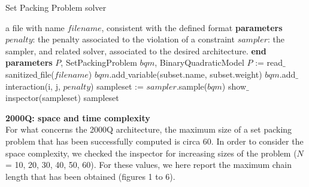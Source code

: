 \documentclass[oneside,a4paper]{article}
\begin{document}
\begin{algorithm}
\caption{Set Packing Problem solver}
\begin{algorithmic}[1]
\Require a file with name $filename$, consistent with the defined format
\State \textbf{parameters}
\Indent
    \State $penalty$: the penalty associated to the violation of a constraint
    \State $sampler$: the sampler, and related solver, associated to the desired architecture.
\EndIndent
\State \textbf{end parameters}
\Variables
 \State $P$, SetPackingProblem
 \State $bqm$, BinaryQuadraticModel
\EndVariables
\State $P$ := read$\_$sanitized$\_$file($filename$)  
        \State $bqm$.add$\_$variable(subset.name, subset.weight)   
\EndFor  \label{loop2}
            \State $bqm$.add$\_$interaction(i, j, $penalty$)   
        \EndFor
    \EndFor
\EndFor  \label{loop3}
\State sampleset := $sampler$.sample($bqm$) 
\State show$\_$inspector(sampleset) 
\State \Return sampleset 
\EndProcedure
\end{algorithmic}
\end{algorithm}

\textbf{2000Q: space and time complexity} \\

For what concerns the 2000Q architecture, the maximum size of a set packing problem that has been successfully computed is circa 60. In order to consider the space complexity, we checked the inspector for increasing sizes of the problem ($N$ = 10, 20, 30, 40, 50, 60). For these values, we here report the maximum chain length that has been obtained (figures 1 to 6).
\end{document}
